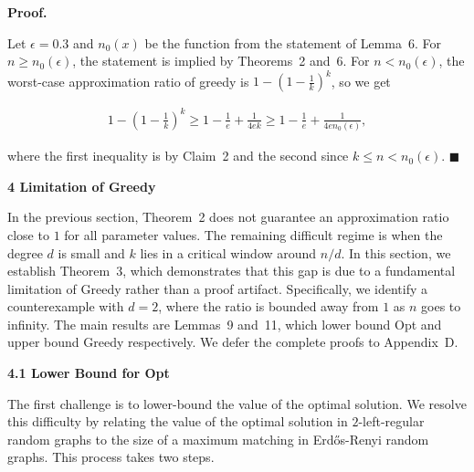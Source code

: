 \documentclass[10pt,a4paper]{article}
\begin{document}
\par\medskip\noindent\textbf{Proof.}\par



Let $\epsilon=0.3$ and $n_{0}(x)$ be the function from the statement of Lemma 6.
For $n\geq n_{0}(\epsilon)$, the statement is implied by Theorems 2 and 6.
For $n<n_{0}(\epsilon)$, the worst-case approximation ratio of greedy is $1-\left(1-\frac{1}{k}\right)^{k}$, so we get\par


\[\begin{gathered}
\displaystyle 1-\left(1-\frac{1}{k}\right)^{k}\geq 1-\frac{1}{e}+\frac{1}{4ek}\geq 1-\frac{1}{e}+\frac{1}{4en_{0}(\epsilon)},
\end{gathered}\]


where the first inequality is by Claim 2 and the second since $k\leq n<n_{0}(\epsilon)$.
\ensuremath{\blacksquare}\par







\par\medskip\noindent\textbf{4 Limitation of Greedy}\par




In the previous section, Theorem 2 does not guarantee an approximation ratio close to $1$ for all parameter values. The remaining difficult regime is when the degree $d$ is small and $k$ lies in a critical window around $n/d$.
In this section, we establish Theorem 3, which demonstrates that this gap is due to a fundamental limitation of Greedy rather than a proof artifact.
Specifically, we identify a counterexample with $d=2$, where the ratio is bounded away from $1$ as $n$ goes to infinity.
The main results are Lemmas 9 and 11, which lower bound Opt and upper bound Greedy respectively.
We defer the complete proofs to Appendix D.\par




\par\medskip\noindent\textbf{4.1 Lower Bound for Opt}\par




The first challenge is to lower-bound the value of the optimal solution.
We resolve this difficulty by relating the value of the optimal solution in $2$-left-regular random graphs to the size of a maximum matching in Erdős-Renyi random graphs.
This process takes two steps.\par
\end{document}
